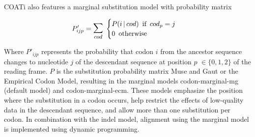 COATi also features a marginal substitution model with probability matrix

\[P'_{ijp} = \mathlarger{\mathlarger{\sum}}_{cod} \thickspace \begin{cases}
P(i \thinspace | \thinspace cod) \enspace \text{if} \enspace cod_p = j\\
0 \enspace \text{otherwise}
\end{cases} \]

Where $P'_{ijp}$ represents the probability that codon $i$ from the ancestor
sequence changes to nucleotide $j$ of the descendant sequence at position $p$
$\in \{0, 1, 2\}$ of the reading frame.
$P$ is the substitution probability matrix Muse and Gaut or the Empirical Codon Model, resulting in the marginal models codon-marginal-mg (default model) and codon-marginal-ecm.
These models emphasize the position where the substitution in a codon occurs, help restrict the effects of low-quality data in the descendant sequence, and allow more than one substitution per codon.
In combination with the indel model, alignment using the marginal model is implemented using dynamic programming.
